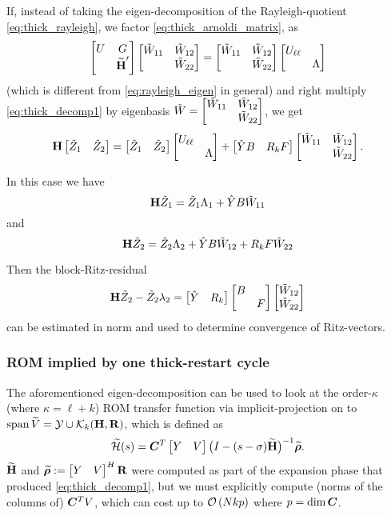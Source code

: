 \bigskip
If, instead of taking the eigen-decomposition of the Rayleigh-quotient \eqref{eq:thick_rayleigh}, we factor \eqref{eq:thick_arnoldi_matrix}, as
\begin{equation}
\begin{bmatrix} U & G \\ &\widetilde{\textbf{\textup{H}}}^\prime\end{bmatrix}\begin{bmatrix} \tilde{W}_{11}&\tilde{W}_{12}\\&\tilde{W}_{22}\end{bmatrix} 
=
\begin{bmatrix} \tilde{W}_{11}&\tilde{W}_{12}\\&\tilde{W}_{22}\end{bmatrix} 
\begin{bmatrix} U_{\ell\ell} &\\&\Lambda\end{bmatrix}
\label{thick_eig_decomp}
\end{equation}
(which is different from \eqref{eq:rayleigh_eigen} in general) and right multiply \eqref{eq:thick_decomp1}  by  eigenbasis $\tilde{W}= \begin{bmatrix} \tilde{W}_{11}&\tilde{W}_{12}\\&\tilde{W}_{22}\end{bmatrix}$, we get 
\[
\textbf{\textup{H}} \begin{bmatrix} \tilde{Z}_1 & \tilde{Z}_2 \end{bmatrix} = 
\begin{bmatrix} \tilde{Z}_1 & \tilde{Z}_2 \end{bmatrix}\begin{bmatrix} U_{\ell\ell} &\\&\Lambda\end{bmatrix} 
+  \begin{bmatrix} \hat{Y} B  &  R_k F\end{bmatrix}\begin{bmatrix} \tilde{W}_{11}&\tilde{W}_{12}\\&\tilde{W}_{22}\end{bmatrix}. 
\]

In this case we have  
 \begin{equation*}
\textbf{\textup{H}} \tilde{Z}_1 =  \tilde{Z}_1\Lambda_1+ \hat{Y} B \tilde{W}_{11} 
\end{equation*}
and 
\begin{equation*}
\textbf{\textup{H}} \tilde{Z}_2 =  \tilde{Z}_2 \Lambda_2+ \hat{Y} B \tilde{W}_{12} + R_k F\tilde{W}_{22}
\end{equation*}

Then the block-Ritz-residual 
\begin{equation}
\textbf{\textup{H}} \tilde{Z}_2 - \tilde{Z}_2 \lambda_2 
=  \begin{bmatrix} \hat{Y} & R_k\end{bmatrix}\begin{bmatrix} B&\\&F\end{bmatrix} \begin{bmatrix} \tilde{W}_{12} \\\tilde{W}_{22}\end{bmatrix}
\end{equation}
can be estimated in norm and used to determine convergence of Ritz-vectors.

\subsubsection{ROM implied by one thick-restart cycle}
The aforementioned eigen-decomposition can be used to look at the order-$\kappa$ (where $\kappa=\ell+k$) ROM transfer function via implicit-projection on to $\operatorname*{span} \widetilde{V}=\mathcal{Y}\cup\mathcal{K}_{k}({\textbf{\textup{H}}},{\textbf{\textup{R}}})$, which is defined as
\begin{equation}
\widetilde{\mathcal{H}}(s) = \bm{C}^T \begin{bmatrix} Y&V\end{bmatrix} \big(I - (s-\sigma)\widetilde{\textbf{\textup{H}}}\big)^{-1} \widetilde{\boldsymbol{\rho}}.
\label{eq:thick_ROM}
\end{equation}
$\widetilde{\textbf{\textup{H}}}$ and  $\widetilde{\boldsymbol{\rho}}:=\begin{bmatrix} Y&V\end{bmatrix}^H\textbf{\textup{R}}$ were computed as part of the expansion phase that produced \eqref{eq:thick_decomp1}, but we must explicitly compute  (norms of the columns of) $\bm{C}^T V$, which can cost up to $\mathcal{O}\left( N k p \right)$ where $p = \dim\bm{C}$.



